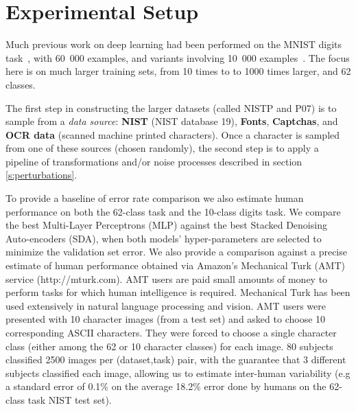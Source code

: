 \documentclass{article} %
\begin{document}
\vspace*{-3mm}
\section{Experimental Setup}
\vspace*{-1mm}

Much previous work on deep learning had been performed on
the MNIST digits task~\citep{Hinton06,ranzato-07-small,Bengio-nips-2006,Salakhutdinov+Hinton-2009},
with 60~000 examples, and variants involving 10~000
examples~\citep{Larochelle-jmlr-toappear-2008,VincentPLarochelleH2008}.
The focus here is on much larger training sets, from 10 times to 
to 1000 times larger, and 62 classes.

The first step in constructing the larger datasets (called NISTP and P07) is to sample from
a {\em data source}: {\bf NIST} (NIST database 19), {\bf Fonts}, {\bf Captchas},
and {\bf OCR data} (scanned machine printed characters). Once a character
is sampled from one of these sources (chosen randomly), the second step is to
apply a pipeline of transformations and/or noise processes described in section \ref{s:perturbations}.

To provide a baseline of error rate comparison we also estimate human performance
on both the 62-class task and the 10-class digits task.
We compare the best Multi-Layer Perceptrons (MLP) against
the best Stacked Denoising Auto-encoders (SDA), when
both models' hyper-parameters are selected to minimize the validation set error.
We also provide a comparison against a precise estimate
of human performance obtained via Amazon's Mechanical Turk (AMT)
service (http://mturk.com). 
AMT users are paid small amounts
of money to perform tasks for which human intelligence is required.
Mechanical Turk has been used extensively in natural language processing and vision.
AMT users were presented
with 10 character images (from a test set) and asked to choose 10 corresponding ASCII
characters. They were forced to choose a single character class (either among the
62 or 10 character classes) for each image.
80 subjects classified 2500 images per (dataset,task) pair,
with the guarantee that 3 different subjects classified each image, allowing
us to estimate inter-human variability (e.g a standard error of 0.1\%
on the average 18.2\% error done by humans on the 62-class task NIST test set). 

\vspace*{-3mm}
\end{document}
